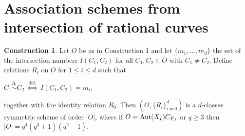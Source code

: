 \documentclass[11pt]{amsart}
\theoremstyle{plain} %
\theoremstyle{definition} %
\newtheorem{const}{Construction}
\theoremstyle{remark} %
\begin{document}
\section{Association schemes from intersection of rational curves}
\begin{const}\label{con2}%
Let $O$ be as in Construction 1 and let $\{m_1,\dots,m_d\}$ the set of the intersection numbers $I(C_1,C_2)$ for all $C_1,C_2\in O$ with $C_1\neq C_2$.
Define relations $R_i$ on $O$ for $1\le i\le d$ such that 
\begin{center}
$C_1\overset{R_i}{\sim}C_2$ $\overset{\mathrm{def.}}{\iff}$ $I(C_1,C_2)=m_i$,
\end{center}
together with the identity relation $R_0$. Then $\left(O,\{R_i\}_{i=0}^d\right)$ is a $d$-classes symmetric scheme of order $|O|$, where if $O={\rm Aut}(X_I)C_{F_J}$ or $q\ge3$ then $|O|=
q^4(q^3+1)(q^2-1)$.
\end{const}
\end{document}
